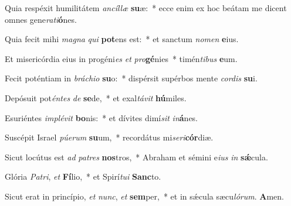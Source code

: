\item Quia respéxit humilitátem \textit{an}\textit{cíl}\textit{læ} \textbf{su}æ:~* ecce enim ex hoc beátam me dicent omnes gene\textit{ra}\textit{ti}\textbf{ó}nes.

\item Quia fecit mihi \textit{ma}\textit{gna} \textit{qui} \textbf{pot}ens est:~* et sanctum \textit{no}\textit{men} \textbf{e}ius.

\item Et misericórdia eius in progéni\textit{es} \textit{et} \textit{pro}\textbf{gé}nies~* timén\textit{ti}\textit{bus} \textbf{e}um.

\item Fecit poténtiam in \textit{brá}\textit{chi}\textit{o} \textbf{su}o:~* dispérsit supérbos mente \textit{cor}\textit{dis} \textbf{su}i.

\item Depósuit pot\textit{én}\textit{tes} \textit{de} \textbf{se}de,~* et exal\textit{tá}\textit{vit} \textbf{hú}miles.

\item Esuriéntes \textit{im}\textit{plé}\textit{vit} \textbf{bo}nis:~* et dívites dimí\textit{sit} \textit{in}\textbf{á}nes.

\item Suscépit Israel \textit{pú}\textit{e}\textit{rum} \textbf{su}um,~* recordátus mi\textit{se}\textit{ri}\textbf{cór}diæ.

\item Sicut locútus est \textit{ad} \textit{pa}\textit{tres} \textbf{nos}tros,~* Abraham et sémini e\textit{ius} \textit{in} \textbf{sǽ}cula.

\item Glória \textit{Pa}\textit{tri}, \textit{et} \textbf{Fí}lio,~* et Spirí\textit{tu}\textit{i} \textbf{Sanc}to.

\item Sicut erat in princípio, \textit{et} \textit{nunc}, \textit{et} \textbf{sem}per,~* et in sǽcula sæcu\textit{ló}\textit{rum}. \textbf{A}men.